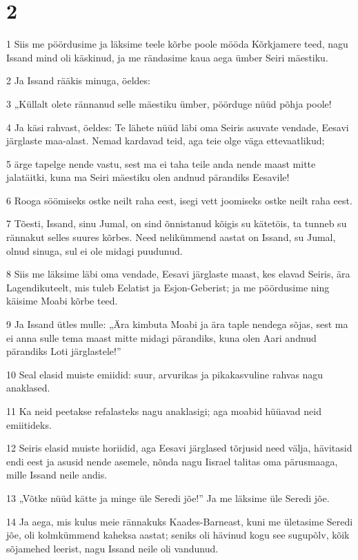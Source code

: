\chapter{2}

\par 1 Siis me pöördusime ja läksime teele kõrbe poole mööda Kõrkjamere teed, nagu Issand mind oli käskinud, ja me rändasime kaua aega ümber Seiri mäestiku.
\par 2 Ja Issand rääkis minuga, öeldes:
\par 3 „Küllalt olete rännanud selle mäestiku ümber, pöörduge nüüd põhja poole!
\par 4 Ja käsi rahvast, öeldes: Te lähete nüüd läbi oma Seiris asuvate vendade, Eesavi järglaste maa-alast. Nemad kardavad teid, aga teie olge väga ettevaatlikud;
\par 5 ärge tapelge nende vastu, sest ma ei taha teile anda nende maast mitte jalatäitki, kuna ma Seiri mäestiku olen andnud pärandiks Eesavile!
\par 6 Rooga söömiseks ostke neilt raha eest, isegi vett joomiseks ostke neilt raha eest.
\par 7 Tõesti, Issand, sinu Jumal, on sind õnnistanud kõigis su kätetöis, ta tunneb su rännakut selles suures kõrbes. Need nelikümmend aastat on Issand, su Jumal, olnud sinuga, sul ei ole midagi puudunud.
\par 8 Siis me läksime läbi oma vendade, Eesavi järglaste maast, kes elavad Seiris, ära Lagendikuteelt, mis tuleb Eelatist ja Esjon-Geberist; ja me pöördusime ning käisime Moabi kõrbe teed.
\par 9 Ja Issand ütles mulle: „Ära kimbuta Moabi ja ära taple nendega sõjas, sest ma ei anna sulle tema maast mitte midagi pärandiks, kuna olen Aari andnud pärandiks Loti järglastele!”
\par 10 Seal elasid muiste emiidid: suur, arvurikas ja pikakasvuline rahvas nagu anaklased.
\par 11 Ka neid peetakse refalasteks nagu anaklasigi; aga moabid hüüavad neid emiitideks.
\par 12 Seiris elasid muiste horiidid, aga Eesavi järglased tõrjusid need välja, hävitasid endi eest ja asusid nende asemele, nõnda nagu Iisrael talitas oma pärusmaaga, mille Issand neile andis.
\par 13 „Võtke nüüd kätte ja minge üle Seredi jõe!” Ja me läksime üle Seredi jõe.
\par 14 Ja aega, mis kulus meie rännakuks Kaades-Barneast, kuni me ületasime Seredi jõe, oli kolmkümmend kaheksa aastat; seniks oli hävinud kogu see sugupõlv, kõik sõjamehed leerist, nagu Issand neile oli vandunud.
